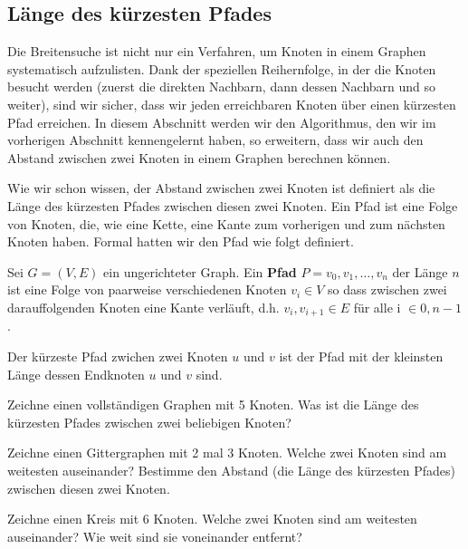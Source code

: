 \subsection{Länge des kürzesten Pfades}

Die Breitensuche ist nicht nur ein Verfahren, um Knoten in einem Graphen systematisch aufzulisten. Dank der speziellen Reihernfolge, in der die Knoten besucht werden (zuerst die direkten Nachbarn, dann dessen Nachbarn und so weiter), sind wir sicher, dass wir jeden erreichbaren Knoten über einen kürzesten Pfad erreichen. In diesem Abschnitt werden wir den Algorithmus, den wir im vorherigen Abschnitt kennengelernt haben, so erweitern, dass wir auch den Abstand zwischen zwei Knoten in einem Graphen berechnen können.

Wie wir schon wissen, der Abstand zwischen zwei Knoten ist definiert als die Länge des kürzesten Pfades zwischen diesen zwei Knoten. Ein Pfad ist eine Folge von Knoten, die, wie eine Kette, eine Kante zum vorherigen und zum nächsten Knoten haben. Formal hatten wir den Pfad wie folgt definiert.

\begin{definition}
Sei \(G = (V,E)\) ein ungerichteter Graph. Ein \textbf{Pfad} \(P = {v_0, v_1, \dots, v_n}\) der Länge \(n\) ist eine Folge von paarweise verschiedenen Knoten \(v_i \in V\) so dass zwischen zwei darauffolgenden Knoten eine Kante verläuft, d.h. \({v_i, v_{i+1}} \in E\) für alle i \(\in {0, n-1}\).
\end{definition}

Der kürzeste Pfad zwichen zwei Knoten \(u\) und \(v\) ist der Pfad mit der kleinsten Länge dessen Endknoten \(u\) und \(v\) sind.

\begin{aufgabe}
Zeichne einen vollständigen Graphen mit 5 Knoten. Was ist die Länge des kürzesten Pfades zwischen zwei beliebigen Knoten?
\end{aufgabe}
\begin{aufgabe}
Zeichne einen Gittergraphen mit 2 mal 3 Knoten. Welche zwei Knoten sind am weitesten auseinander? Bestimme den Abstand (die Länge des kürzesten Pfades) zwischen diesen zwei Knoten.
\end{aufgabe}
\begin{aufgabe}
Zeichne einen Kreis mit 6 Knoten. Welche zwei Knoten sind am weitesten auseinander? Wie weit sind sie voneinander entfernt?
\end{aufgabe}

